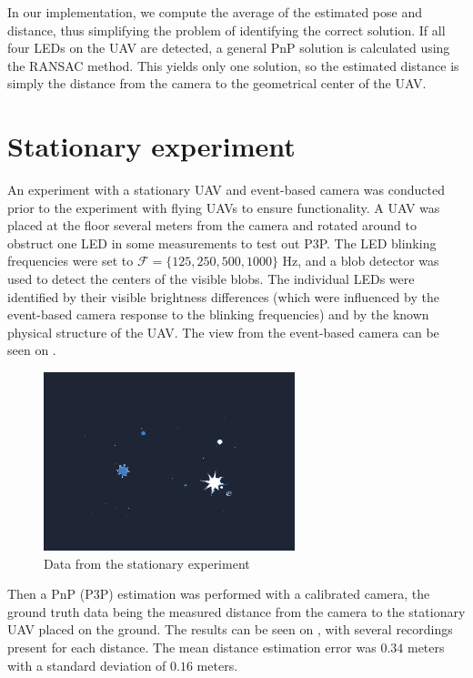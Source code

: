 In our implementation, we compute the average of the estimated pose and distance, thus simplifying the problem of identifying the correct solution. If all four \ac{LED}s on the \ac{UAV} are detected, a general \ac{PnP} solution is calculated using the \ac{RANSAC} method. This yields only one solution, so the
estimated distance is simply the distance from the camera to the geometrical center of the \ac{UAV}.

\section{Stationary experiment\label{sec:stationary_experiment}}
An experiment with a stationary \ac{UAV} and event-based camera was conducted prior to the experiment with flying \ac{UAV}s to ensure functionality.
A \ac{UAV} was placed at the floor several meters from the camera and rotated around to obstruct one \ac{LED} in some measurements to test out \ac{P3P}. The \ac{LED} blinking frequencies were set to $\mathcal{F} = \{125, 250, 500, 1000\}$ Hz, and a blob detector was used to detect the centers of the visible blobs. The individual \ac{LED}s were identified by their visible
brightness differences (which were influenced by the event-based camera response to the blinking frequencies) and by the known physical structure of the \ac{UAV}. The view from the event-based camera can be seen on .
\begin{figure}[H]
	\centering
	\includegraphics[width=0.65\textwidth]{./fig/photos/pnpmeas.png}
	\caption{Data from the stationary experiment}
	\label{fig:pnpuav}
\end{figure}
Then a \ac{PnP} (\ac{P3P}) estimation was performed with a calibrated camera, the ground truth data being the measured distance from the camera to the
stationary \ac{UAV} placed on the ground.
The results can be seen on , with several recordings
present for each distance. The mean distance estimation error was $0.34$ meters with a standard deviation of $0.16$ meters.
